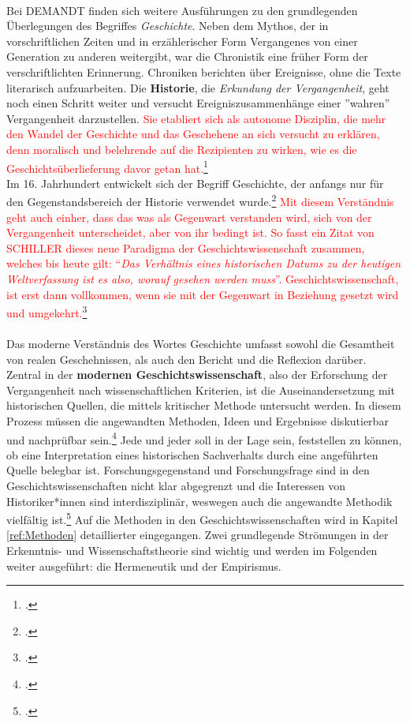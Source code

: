 \documentclass[12pt,a4paper]{article}
\begin{document}
\\
Bei DEMANDT finden sich weitere Ausführungen zu den grundlegenden Überlegungen des Begriffes \textit{Geschichte}. Neben dem Mythos, der in vorschriftlichen Zeiten und in erzählerischer Form Vergangenes von einer Generation zu anderen weitergibt, war die Chronistik eine früher Form der verschriftlichten Erinnerung. Chroniken berichten über Ereignisse, ohne die Texte literarisch aufzuarbeiten. Die \textbf{Historie}, die \textit{Erkundung der Vergangenheit}, geht noch einen Schritt weiter und versucht Ereigniszusammenhänge einer ''wahren'' Vergangenheit darzustellen. \textcolor{red}{Sie etabliert sich als autonome Disziplin, die mehr den Wandel der Geschichte und das Geschehene an sich versucht zu erklären, denn moralisch und belehrende auf die Rezipienten zu wirken, wie es die Geschichtsüberlieferung davor getan hat.\footcite[][S.24]{hardtwig1990geschichtskultur}}
\\
Im 16. Jahrhundert entwickelt sich der Begriff Geschichte, der anfangs nur für den Gegenstandsbereich der Historie verwendet wurde.\footcite[][S.57-58]{schulz2010neuere} \textcolor{red}{Mit diesem Verständnis geht auch einher, dass das was als Gegenwart verstanden wird, sich von der Vergangenheit unterscheidet, aber von ihr bedingt ist. So fasst ein Zitat von SCHILLER dieses neue Paradigma der Geschichtswissenschaft zusammen, welches bis heute gilt: “\textit{Das Verhältnis eines historischen Datums zu der heutigen Weltverfassung ist es also, worauf gesehen werden muss}”. Geschichtswissenschaft, ist erst dann vollkommen, wenn sie mit der Gegenwart in Beziehung gesetzt wird und umgekehrt.\footcite[][S.25]{hardtwig1990geschichtskultur}
}
\\
\\
Das moderne Verständnis des Wortes Geschichte umfasst sowohl die Gesamtheit von realen Geschehnissen, als auch den Bericht und die Reflexion darüber. Zentral in der \textbf{modernen Geschichtswissenschaft}, also der Erforschung der Vergangenheit nach wissenschaftlichen Kriterien, ist die Auseinandersetzung mit historischen Quellen, die mittels kritischer Methode untersucht werden. In diesem Prozess müssen die angewandten Methoden, Ideen und Ergebnisse diskutierbar und nachprüfbar sein.\footcite[][S.13-32]{demand2011philosophie} Jede und jeder soll in der Lage sein, feststellen zu können, ob eine Interpretation eines historischen Sachverhalts durch eine angeführten Quelle belegbar ist. Forschungsgegenstand und Forschungsfrage sind in den Geschichtswissenschaften nicht klar abgegrenzt und die Interessen von Historiker*innen sind interdisziplinär, weswegen auch die angewandte Methodik vielfältig ist.\footcite[][S.13]{reiche2014verfahren} Auf die Methoden in den Geschichtswissenschaften wird in Kapitel \ref{ref:Methoden} detaillierter eingegangen.
Zwei grundlegende Strömungen in der Erkenntnis- und Wissenschaftstheorie sind wichtig und werden im Folgenden weiter ausgeführt: die Hermeneutik und der Empirismus.
\end{document}
